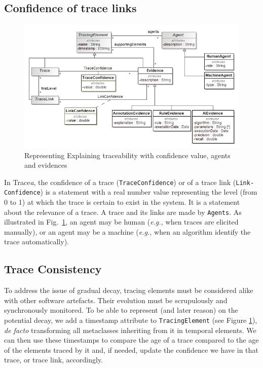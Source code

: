 	\vspace{-0.4truecm}
\subsection{Confidence of trace links}
\begin{figure}[h] 
	\centering
		\vspace{-0.4truecm}

	\includegraphics[width=.99\linewidth]{images/explainability.jpg}
	\caption{Representing Explaining traceability with confidence value, agents and evidences}
	\label{fig:explainability}
\end{figure}


In Trace\textit{a}, the confidence of a trace (\texttt{TraceConfidence}) or of a trace link (\texttt{Link- Confidence}) is a statement with a real number value representing the level (from 0 to 1) at which the trace is certain to exist in the system.
It is a statement about the relevance of a trace. A trace and its links are made by \texttt{Agents}. As illustrated in Fig.~\ref{fig:explainability}, an agent may be human (\textit{e.g.,} when traces are elicited manually), or an agent may be a machine (\textit{e.g.,} when an algorithm identify the trace automatically).


\subsection{Trace Consistency}
To address the issue of gradual decay, tracing elements must be considered alike with other software artefacts. Their evolution must be scrupulously and synchronously monitored. To be able to represent (and later reason) on the potential decay, we add a timestamp attribute to \texttt{TracingElement} (see Figure \ref{fig:explainability}), \textit{de facto} transforming all metaclasses inheriting from it in temporal elements. We can then use these timestamps to compare the age of a trace compared to the age of the elements traced by it and, if needed, update the confidence we have in that trace, or trace link, accordingly.


